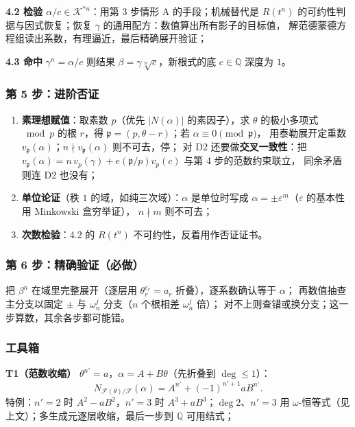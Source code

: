 \documentclass[UTF8,a4paper,11pt]{ctexart}
\begin{document}
\textbf{4.2 检验 $\alpha/c\in\mathscr{K}^{*n}$}：用第 3 步情形 A 的手段；机械替代是
$R(t^n)$ 的可约性判据与因式恢复；恢复 $\gamma$ 的通用配方：数值算出所有影子的目标值，
解范德蒙德方程组读出系数，有理逼近，最后精确展开验证；\par

\textbf{4.3 命中} $\gamma^n=\alpha/c$ 则结果 $\beta=\gamma\sqrt[n]{c}$，新根式的底
$c\in\mathbb{Q}$ 深度为 $1$。\par

\subsubsection{第 5 步：进阶否证}

\begin{enumerate}
\item \textbf{素理想赋值}：取素数 $p$（优先 $|N(\alpha)|$ 的素因子），求 $\theta$ 的极小多项式
$\bmod p$ 的根 $r$，得 $\mathfrak{p}=(p,\theta-r)$；若 $\alpha\equiv0\pmod{\mathfrak{p}}$，
用泰勒展开定重数 $v_{\mathfrak{p}}(\alpha)$；$n\nmid v_{\mathfrak{p}}(\alpha)$ 则不可去，停；
对 D2 还要做\textbf{交叉一致性}：把
$v_{\mathfrak{p}}(\alpha)=n\,v_p(\gamma)+e(\mathfrak{p}/p)v_p(c)$ 与第 4 步的范数约束联立，
同余矛盾则连 D2 也没有；
\item \textbf{单位论证}（秩 $1$ 的域，如纯三次域）：$\alpha$ 是单位时写成
$\alpha=\pm\varepsilon^m$（$\varepsilon$ 的基本性用 Minkowski 盒穷举证），
$n\nmid m$ 则不可去；
\item \textbf{次数检验}：4.2 的 $R(t^n)$ 不可约性，反着用作否证证书。
\end{enumerate}

\subsubsection{第 6 步：精确验证（必做）}

把 $\beta^n$ 在域里完整展开（逐层用 $\theta_r^{e_r}=a_r$ 折叠），逐系数确认等于 $\alpha$；
再数值抽查主分支以固定 $\pm$ 与 $\omega_n^j$ 分支（$n$ 个根相差 $\omega_n^j$ 倍）；
对不上则查错或换分支；这一步算数，其余各步都可能错。\par

\subsubsection{工具箱}

\textbf{T1（范数收缩）} $\theta^{n'}=a$，$\alpha=A+B\theta$（先折叠到 $\deg\le1$）：
\[
N_{\mathscr{F}(\theta)/\mathscr{F}}(\alpha)=A^{n'}+(-1)^{n'+1}aB^{n'}.
\]
特例：$n'=2$ 时 $A^2-aB^2$，$n'=3$ 时 $A^3+aB^3$；$\deg2$、$n'=3$ 用
$\omega$-恒等式（见上文）；多生成元逐层收缩，最后一步到 $\mathbb{Q}$ 可用结式；\par
\end{document}

